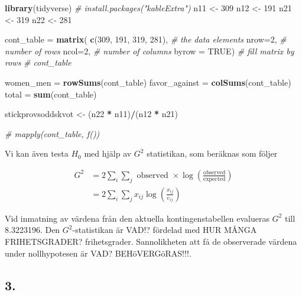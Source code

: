 \documentclass[]{article}
\newenvironment{Shaded}{\begin{snugshade}}{\end{snugshade}}
\newcommand{\CommentTok}[1]{\textcolor[rgb]{0.56,0.35,0.01}{\textit{#1}}}
\newcommand{\DataTypeTok}[1]{\textcolor[rgb]{0.13,0.29,0.53}{#1}}
\newcommand{\DecValTok}[1]{\textcolor[rgb]{0.00,0.00,0.81}{#1}}
\newcommand{\KeywordTok}[1]{\textcolor[rgb]{0.13,0.29,0.53}{\textbf{#1}}}
\newcommand{\NormalTok}[1]{#1}
\newcommand{\OperatorTok}[1]{\textcolor[rgb]{0.81,0.36,0.00}{\textbf{#1}}}
\newcommand{\OtherTok}[1]{\textcolor[rgb]{0.56,0.35,0.01}{#1}}
\newcommand{\StringTok}[1]{\textcolor[rgb]{0.31,0.60,0.02}{#1}}
\begin{document}
\begin{Shaded}
\begin{Highlighting}[]
\KeywordTok{library}\NormalTok{(tidyverse)}
\CommentTok{# install.packages("kableExtra")}
\NormalTok{n11 <-}\StringTok{ }\DecValTok{309}
\NormalTok{n12 <-}\StringTok{ }\DecValTok{191}
\NormalTok{n21 <-}\StringTok{ }\DecValTok{319}
\NormalTok{n22 <-}\StringTok{ }\DecValTok{281}

\NormalTok{cont_table =}\StringTok{ }\KeywordTok{matrix}\NormalTok{(}
  \KeywordTok{c}\NormalTok{(}\DecValTok{309}\NormalTok{, }\DecValTok{191}\NormalTok{, }\DecValTok{319}\NormalTok{, }\DecValTok{281}\NormalTok{), }\CommentTok{# the data elements }
  \DataTypeTok{nrow=}\DecValTok{2}\NormalTok{,              }\CommentTok{# number of rows }
  \DataTypeTok{ncol=}\DecValTok{2}\NormalTok{,              }\CommentTok{# number of columns }
  \DataTypeTok{byrow =} \OtherTok{TRUE}\NormalTok{)  }\CommentTok{# fill matrix by rows }
\CommentTok{# cont_table}

\NormalTok{women_men =}\StringTok{ }\KeywordTok{rowSums}\NormalTok{(cont_table)}
\NormalTok{favor_against =}\StringTok{ }\KeywordTok{colSums}\NormalTok{(cont_table)}
\NormalTok{total =}\StringTok{ }\KeywordTok{sum}\NormalTok{(cont_table)}

\NormalTok{stickprovsoddskvot <-}\StringTok{ }\NormalTok{(n22 }\OperatorTok{*}\StringTok{ }\NormalTok{n11)}\OperatorTok{/}\NormalTok{(n12 }\OperatorTok{*}\StringTok{ }\NormalTok{n21)}


\CommentTok{# mapply(cont_table, f())}
\end{Highlighting}
\end{Shaded}

Vi kan även testa \(H_{0}\) med hjälp av \(G^{2}\) statistikan, som
beräknas som följer

\[
\begin{aligned} 
G^{2} &= 2 \sum_{i} \sum_{j} \text{ observed } \times \log \left( 
\frac{\text{observed}}{\text{expected}} 
\right)\\
&=2 \sum_{i} \sum_{j}  x_{ij} \log 
\left( 
\frac{x_{ij}}{e_{ij}} 
\right)
\end{aligned}
\]

Vid inmatning av värdena från den aktuella kontingenstabellen evalueras
\(G^{2}\) till 8.3223196. Den \(G^{2}\)-statistikan är VAD!? fördelad
med HUR MÅNGA FRIHETSGRADER? frihetsgrader. Sannolikheten att få de
observerade värdena under nollhypotesen är VAD? BEHöVERGöRAS!!!.

\hypertarget{section-1}{%
\subsection{3.}\label{section-1}}
\end{document}
